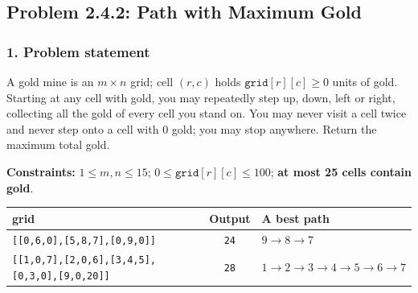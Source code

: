 \subsection{Problem 2.4.2: Path with Maximum Gold}


\subsubsection*{1. Problem statement}

A gold mine is an $m \times n$ grid; cell $(r,c)$ holds $\texttt{grid}[r][c] \ge 0$ units of gold. Starting at any cell with gold, you may repeatedly step up, down, left or right, collecting all the gold of every cell you stand on. You may never visit a cell twice and never step onto a cell with $0$ gold; you may stop anywhere. Return the maximum total gold.

\textbf{Constraints:} $1 \le m, n \le 15$; $0 \le \texttt{grid}[r][c] \le 100$; \textbf{at most 25 cells contain gold}.

\begin{table}[H]
\centering\small
\begin{tabular}{@{}lcl@{}}
\toprule
\textbf{grid} & \textbf{Output} & \textbf{A best path} \\
\midrule
\texttt{[[0,6,0],[5,8,7],[0,9,0]]} & \texttt{24} & $9 \to 8 \to 7$ \\
\texttt{[[1,0,7],[2,0,6],[3,4,5],[0,3,0],[9,0,20]]} & \texttt{28} & $1 \to 2 \to 3 \to 4 \to 5 \to 6 \to 7$ \\
\bottomrule
\end{tabular}
\end{table}

